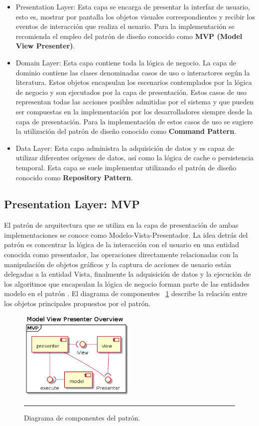 \begin{itemize}
	\item Presentation Layer: Esta capa se encarga de presentar la interfaz de usuario, esto es, mostrar por pantalla los objetos visuales correspondientes y recibir los eventos de interacción que realiza el usuario. Para la implementación se recomienda el empleo del patrón de diseño conocido como \textbf{MVP (Model View Presenter)}. 
	\item Domain Layer: Esta capa contiene toda la lógica de negocio. La capa de dominio contiene las clases denominadas casos de uso o interactores según la literatura. Estos objetos encapsulan los escenarios contemplados por la lógica de negocio y son ejecutados por la capa de presentación. Estos casos de uso representan todas las acciones posibles admitidas por el sistema y que pueden ser compuestas en la implementación por los desarrolladores siempre desde la capa de presentación. Para la implementación de estos casos de uso se sugiere la utilización del patrón de diseño conocido como \textbf{Command Pattern}.
	\item Data Layer: Esta capa administra la adquisición de datos y es capaz de utilizar diferentes orígenes de datos, así como la lógica de cache o persistencia temporal. Esta capa se suele implementar utilizando el patrón de diseño conocido como \textbf{Repository Pattern}.  
\end{itemize}

\subsection{Presentation Layer: MVP}
El patrón de arquitectura que se utiliza en la capa de presentación de ambas implementaciones se conoce como Modelo-Vista-Presentador.
La idea detrás del patrón es concentrar la lógica de la interacción con el usuario en una entidad conocida como presentador, las operaciones directamente relacionadas con la manipulación de objetos gráficos y la captura de acciones de usuario están delegadas a la entidad Vista, finalmente la adquisición de datos y la ejecución de los algoritmos que encapsulan la lógica de negocio forman parte de las entidades modelo en el patrón \cite{mvp_leiva}.
El diagrama de componentes ~\ref{fig:uml_mvp_component} describe la relación entre los objetos principales propuestos por el patrón.

\begin{figure}[htbp]
	\centering
	\includegraphics[width=0.5\textwidth]{Figures/uml_mvp_component.png}
	\rule{35em}{1pt}
	\caption[MVP Components]{Diagrama de componentes del patrón.}
	\label{fig:uml_mvp_component}
\end{figure}

